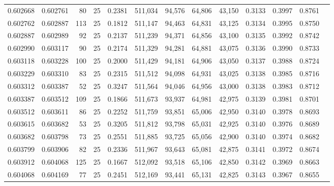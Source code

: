 \begin{tabular}{rrrrrrrrrrrrr}
0.602668 & 0.602761 &    80 &  25 &                                     0.2381 & 511,034 &  94,576 &  64,806 &  43,150 & 0.3133 & 0.3997 & 0.8761 \\
0.602762 & 0.602887 &   113 &  25 &                                     0.1812 & 511,147 &  94,463 &  64,831 &  43,125 & 0.3134 & 0.3995 & 0.8750 \\
0.602887 & 0.602989 &    92 &  25 &                                     0.2137 & 511,239 &  94,371 &  64,856 &  43,100 & 0.3135 & 0.3992 & 0.8742 \\
0.602990 & 0.603117 &    90 &  25 &                                     0.2174 & 511,329 &  94,281 &  64,881 &  43,075 & 0.3136 & 0.3990 & 0.8733 \\
0.603118 & 0.603228 &   100 &  25 &                                     0.2000 & 511,429 &  94,181 &  64,906 &  43,050 & 0.3137 & 0.3988 & 0.8724 \\
0.603229 & 0.603310 &    83 &  25 &                                     0.2315 & 511,512 &  94,098 &  64,931 &  43,025 & 0.3138 & 0.3985 & 0.8716 \\
0.603312 & 0.603387 &    52 &  25 &                                     0.3247 & 511,564 &  94,046 &  64,956 &  43,000 & 0.3138 & 0.3983 & 0.8712 \\
0.603387 & 0.603512 &   109 &  25 &                                     0.1866 & 511,673 &  93,937 &  64,981 &  42,975 & 0.3139 & 0.3981 & 0.8701 \\
0.603512 & 0.603611 &    86 &  25 &                                     0.2252 & 511,759 &  93,851 &  65,006 &  42,950 & 0.3140 & 0.3978 & 0.8693 \\
0.603615 & 0.603682 &    53 &  25 &                                     0.3205 & 511,812 &  93,798 &  65,031 &  42,925 & 0.3140 & 0.3976 & 0.8689 \\
0.603682 & 0.603798 &    73 &  25 &                                     0.2551 & 511,885 &  93,725 &  65,056 &  42,900 & 0.3140 & 0.3974 & 0.8682 \\
0.603799 & 0.603906 &    82 &  25 &                                     0.2336 & 511,967 &  93,643 &  65,081 &  42,875 & 0.3141 & 0.3972 & 0.8674 \\
0.603912 & 0.604068 &   125 &  25 &                                     0.1667 & 512,092 &  93,518 &  65,106 &  42,850 & 0.3142 & 0.3969 & 0.8663 \\
0.604068 & 0.604169 &    77 &  25 &                                     0.2451 & 512,169 &  93,441 &  65,131 &  42,825 & 0.3143 & 0.3967 & 0.8655 \\

\end{tabular}

